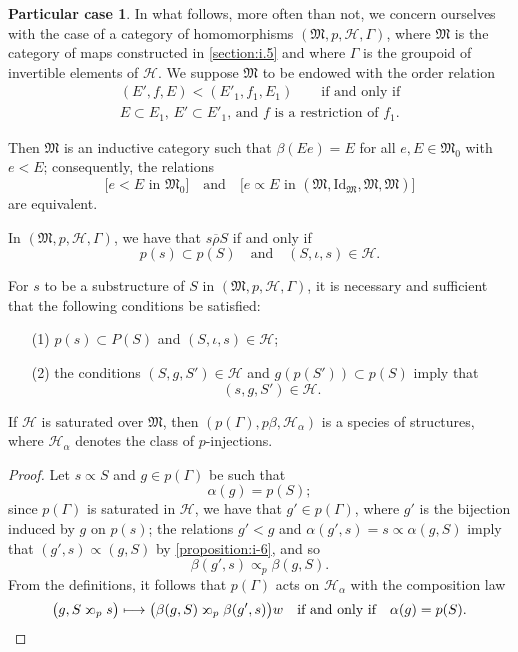 \documentclass[a4paper,fleqn]{article}
\theoremstyle{plain}
\newenvironment{proposition}[1]
  {\renewcommand\theinnerproposition{#1}\innerproposition}
  {\endinnerproposition}
\theoremstyle{definition}
\newtheorem*{particular}{Particular case}
\newcommand{\oldpage}[1]{{\marginpar{\footnotesize$\bigg\vert$\,\,\,\,\textit{p.~#1}}}}
\newcommand{\textand}{\quad\text{and}\quad}
\newcommand{\HH}{\mathcal{H}}
\newcommand{\MM}{\mathfrak{M}}
\newcommand{\relrhobar}{\mathrel{\overline{\rho}}}
\newcommand{\subs}{\mathrel{\propto}}
\newcommand{\sups}{\mathrel{\reflectbox{$\propto$}}}
\newcommand{\Id}{\mathrm{Id}}
\begin{document}
\begin{particular}
  In what follows, more often than not, we concern ourselves with the case of a category of homomorphisms $(\MM,p,\HH,\Gamma)$, where $\MM$ is the category of maps constructed in \cref{section:i.5} and where $\Gamma$ is the groupoid of invertible elements of $\HH$.
  We suppose $\MM$ to be endowed with the order relation
  \[
    \begin{gathered}
      (E',f,E) < (E'_1,f_1,E_1)
      \qquad\text{if and only if}
    \\\text{$E\subset E_1$, $E'\subset E'_1$, and $f$ is a restriction of $f_1$.}
    \end{gathered}
  \]

  Then $\MM$ is an inductive category such that $\beta(Ee)=E$ for all $e,E\in\MM_0$ with $e<E$;
  consequently, the relations
  \[
    \big[\text{$e<E$ in $\MM_0$}\big]
    \textand
    \big[\text{$e\subs E$ in $(\MM,\Id_\MM,\MM,\MM)$}\big]
  \]
  are equivalent.

  In $(\MM,p,\HH,\Gamma)$, we have that $s\relrhobar S$ if and only if
  \[
    p(s)\subset p(S)
    \textand
    (S,\iota,s)\in\HH.
  \]

  For $s$ to be a substructure of $S$ in $(\MM,p,\HH,\Gamma)$, it is necessary and sufficient that the following conditions be satisfied:
  \begin{enumerate}
    \item[\normalfont(1)]
      $p(s)\subset P(S)$ and $(S,\iota,s)\in\HH$;
    \item[\normalfont(2)]
      the conditions $(S,g,S')\in\HH$ and $g(p(S'))\subset p(S)$ imply that
      \[
        (s,g,S')\in\HH.
      \]
  \end{enumerate}
\end{particular}

\begin{proposition}{15}
\label{proposition:i-15}
  If $\HH$ is saturated over $\MM$, then $(p(\Gamma),p\beta,\HH_\alpha)$ is a species of structures, where $\HH_\alpha$ denotes the class of $p$-injections.
\end{proposition}

\begin{proof}
  Let $s\subs S$ and $g\in p(\Gamma)$ be such that
  \[
    \alpha(g)
    = p(S);
  \]
  since $p(\Gamma)$ is saturated in $\HH$, we have that $g'\in p(\Gamma)$, where $g'$ is the bijection induced by $g$ on $p(s)$;
  the relations $g'<g$ and $\alpha(g',s)=s\subs\alpha(g,S)$ imply that $(g',s)\subs(g,S)$ by \cref{proposition:i-6}, and so
  \[
    \beta(g',s)
    \subs_p \beta(g,S).
  \]
  \oldpage{380}
  From the definitions, it follows that $p(\Gamma)$ acts on $\HH_\alpha$ with the composition law
  \[
    \big(
      g, S\sups_p s
    \big)
    \longmapsto
    \big(
      \beta(g,S) \sups_p \beta(g',s)
    \big)w
    \quad\text{if and only if}\quad
    \alpha(g)=p(S).
    \qedhere
  \]
\end{proof}
\end{document}
